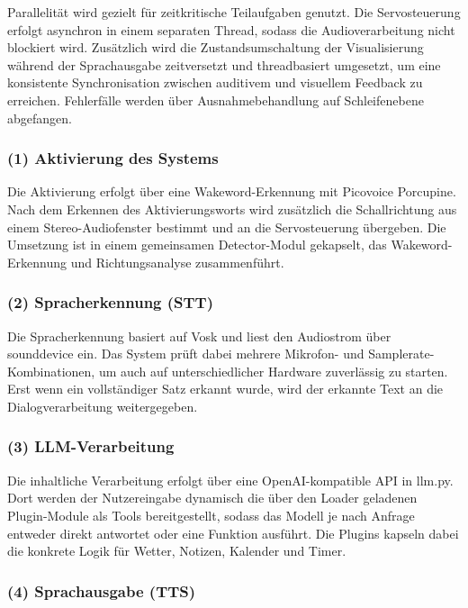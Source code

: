 Parallelität wird gezielt für zeitkritische Teilaufgaben genutzt. 
Die Servosteuerung erfolgt asynchron in einem separaten Thread, sodass die Audioverarbeitung nicht blockiert wird. 
Zusätzlich wird die Zustandsumschaltung der Visualisierung während der Sprachausgabe zeitversetzt und threadbasiert umgesetzt, um eine konsistente Synchronisation zwischen auditivem und visuellem Feedback zu erreichen. 
Fehlerfälle werden über Ausnahmebehandlung auf Schleifenebene abgefangen. 

\subsubsection{(1) Aktivierung des Systems}

Die Aktivierung erfolgt über eine Wakeword-Erkennung mit Picovoice Porcupine. 
Nach dem Erkennen des Aktivierungsworts wird zusätzlich die Schallrichtung aus einem Stereo-Audiofenster bestimmt und an die Servosteuerung übergeben. 
Die Umsetzung ist in einem gemeinsamen Detector-Modul gekapselt, das Wakeword-Erkennung und Richtungsanalyse zusammenführt.


\subsubsection{(2) Spracherkennung (STT)}

Die Spracherkennung basiert auf Vosk und liest den Audiostrom über sounddevice ein. 
Das System prüft dabei mehrere Mikrofon- und Samplerate-Kombinationen, um auch auf unterschiedlicher Hardware zuverlässig zu starten. 
Erst wenn ein vollständiger Satz erkannt wurde, wird der erkannte Text an die Dialogverarbeitung weitergegeben.


\subsubsection{(3) LLM-Verarbeitung}

Die inhaltliche Verarbeitung erfolgt über eine OpenAI-kompatible API in llm.py. 
Dort werden der Nutzereingabe dynamisch die über den Loader geladenen Plugin-Module als Tools bereitgestellt, sodass das Modell je nach Anfrage entweder direkt antwortet oder eine Funktion ausführt. 
Die Plugins kapseln dabei die konkrete Logik für Wetter, Notizen, Kalender und Timer.


\subsubsection{(4) Sprachausgabe (TTS)}

